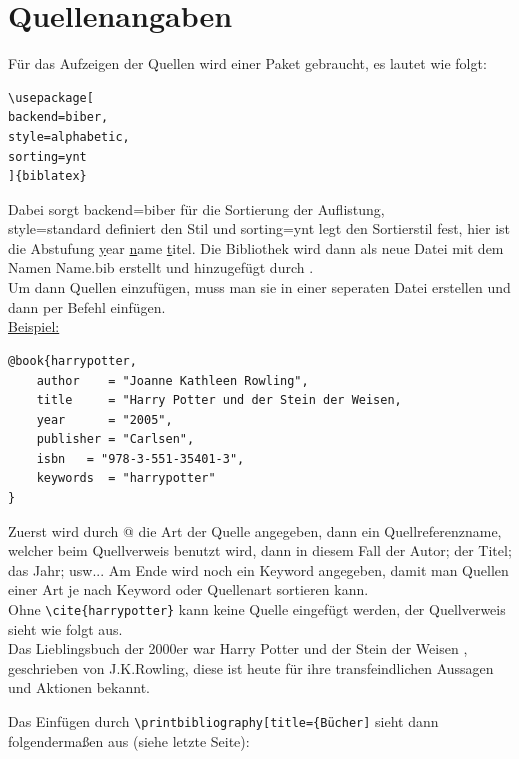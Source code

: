 \documentclass[ngerman]{scrreport}
\begin{document}
\section{Quellenangaben}
Für das Aufzeigen der Quellen wird einer Paket gebraucht, es lautet wie folgt:\\
{\color{blue}
\begin{verbatim}
\usepackage[
backend=biber,
style=alphabetic,
sorting=ynt
]{biblatex}

\end{verbatim}}
Dabei sorgt backend=biber für die Sortierung der Auflistung,\\
style=standard definiert den Stil und sorting=ynt legt den Sortierstil fest, hier ist die Abstufung {\color{blue}\underline{y}}ear {\color{blue}\underline{n}}ame {\color{blue}\underline{t}}itel.
Die Bibliothek wird dann als neue Datei mit dem Namen Name.bib erstellt und hinzugefügt durch {\color{blue}\verb||}.\\
\vspace{3cm}
Um dann Quellen einzufügen, muss man sie in einer seperaten Datei erstellen und dann per Befehl einfügen.\\
\underline{Beispiel:}\\
\color{blue}
\begin{verbatim}
@book{harrypotter,
    author    = "Joanne Kathleen Rowling",
    title     = "Harry Potter und der Stein der Weisen,
    year      = "2005",
    publisher = "Carlsen",
    isbn   = "978-3-551-35401-3",
    keywords  = "harrypotter"
}
\end{verbatim}

\color{black}
Zuerst wird durch @ die Art der Quelle angegeben, dann ein Quellreferenzname, welcher beim Quellverweis benutzt wird, dann in diesem Fall der Autor; der Titel; das Jahr; usw... Am Ende wird noch ein Keyword angegeben, damit man Quellen einer Art je nach Keyword oder Quellenart sortieren kann.\\
Ohne {\color{blue}\verb|\cite{harrypotter}|} kann keine Quelle eingefügt werden, der Quellverweis sieht wie folgt aus.\\
Das Lieblingsbuch der 2000er war Harry Potter und der Stein der Weisen \cite{harrypotter}, geschrieben von J.K.Rowling, diese ist heute für ihre transfeindlichen Aussagen und Aktionen bekannt.

Das Einfügen durch {\color{blue}\verb|\printbibliography[title={Bücher]|} sieht dann folgendermaßen aus (siehe letzte Seite):\\
\end{document}
